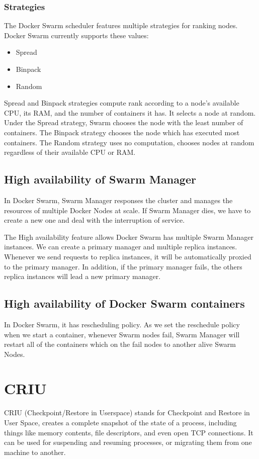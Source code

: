 \subsubsection{Strategies}
The Docker Swarm scheduler features multiple strategies for ranking nodes. Docker Swarm currently supports these values:
\begin{itemize}
    \item Spread
    \item Binpack
    \item Random
\end{itemize}
Spread and Binpack strategies compute rank according to a node’s available CPU, its RAM, and the number of containers it has. It selects a node at random.
Under the Spread strategy, Swarm chooses the node with the least number of containers.
The Binpack strategy chooses the node which has executed most containers.
The Random strategy uses no computation, chooses nodes at random regardless of their available CPU or RAM.

\subsection{High availability of Swarm Manager}
In Docker Swarm, Swarm Manager responses the cluster and manages the resources of multiple Docker Nodes at scale. If Swarm Manager dies, we have to create a new one and deal with the interruption of service.

The High availability feature allows Docker Swarm has multiple Swarm Manager instances. We can create a primary manager and multiple replica instances.
Whenever we send requests to replica instances, it will be automatically proxied to the primary manager.
In addition, if the primary manager fails, the others replica instances will lead a new primary manager.

\subsection{High availability of Docker Swarm containers}
In Docker Swarm, it has rescheduling policy. As we set the reschedule policy when we start a container, whenever Swarm nodes fail, Swarm Manager will restart all of the containers which on the fail nodes to another alive Swarm Nodes.

\section{CRIU}
CRIU \cite{CRIU} (Checkpoint/Restore in Userspace) stands for Checkpoint and Restore in User Space, creates a complete snapshot of the state of a process, including things like memory contents, file descriptors, and even open TCP connections. It can be used for suspending and resuming processes, or migrating them from one machine to another.
